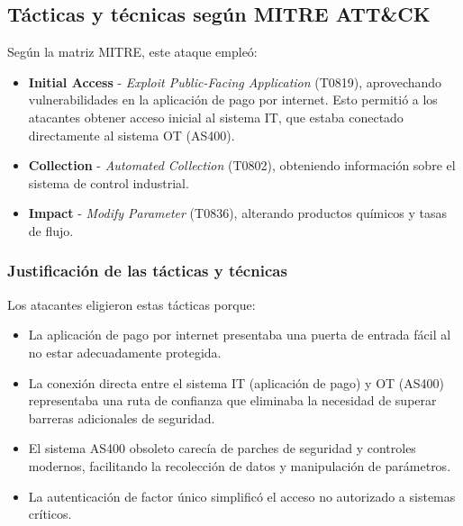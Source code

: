     \subsection{Tácticas y técnicas según MITRE ATT\&CK}
Según la matriz MITRE, este ataque empleó:

\begin{itemize}
    \item \textbf{Initial Access} - \textit{Exploit Public-Facing Application} (T0819), aprovechando vulnerabilidades en la aplicación de pago por internet.
    Esto permitió a los atacantes obtener acceso inicial al sistema IT, que estaba conectado directamente al sistema OT (AS400).
    
    
    \item \textbf{Collection} - \textit{Automated Collection} (T0802), obteniendo información sobre el sistema de control industrial.
    
    \item \textbf{Impact} - \textit{Modify Parameter} (T0836), alterando productos químicos y tasas de flujo.
\end{itemize}

\subsubsection{Justificación de las tácticas y técnicas}
Los atacantes eligieron estas tácticas porque:

\begin{itemize}
    \item La aplicación de pago por internet presentaba una puerta de entrada fácil al no estar adecuadamente protegida.
    
    \item La conexión directa entre el sistema IT (aplicación de pago) y OT (AS400) representaba una ruta de confianza que eliminaba la necesidad de superar barreras adicionales de seguridad.
    
    \item El sistema AS400 obsoleto carecía de parches de seguridad y controles modernos, facilitando la recolección de datos y manipulación de parámetros.
    
    \item La autenticación de factor único simplificó el acceso no autorizado a sistemas críticos.
\end{itemize}

